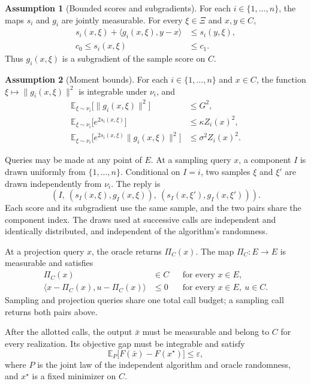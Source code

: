 \documentclass[10pt]{article}
\theoremstyle{definition}
\newtheorem{assumption}{Assumption}
\begin{document}
\begin{assumption}[Bounded scores and subgradients]
For each $i\in\{1,\ldots,n\}$, the maps $s_i$ and $g_i$ are jointly measurable. For every $\xi\in\Xi$ and $x,y\in C$,
\[
\begin{aligned}
s_i(x,\xi)+\langle g_i(x,\xi),y-x\rangle
&\leq s_i(y,\xi),\\
c_0\leq s_i(x,\xi)&\leq c_1.
\end{aligned}
\]
Thus $g_i(x,\xi)$ is a subgradient of the sample score on $C$.
\end{assumption}

\begin{assumption}[Moment bounds]
For each $i\in\{1,\ldots,n\}$ and $x\in C$, the function $\xi\mapsto\|g_i(x,\xi)\|^2$ is integrable under $\nu_i$, and
\[
\begin{aligned}
\mathbb{E}_{\xi\sim\nu_i}\bigl[\|g_i(x,\xi)\|^2\bigr]
&\leq G^2,\\
\mathbb{E}_{\xi\sim\nu_i}\bigl[e^{2s_i(x,\xi)}\bigr]
&\leq \kappa Z_i(x)^2,\\
\mathbb{E}_{\xi\sim\nu_i}\bigl[e^{2s_i(x,\xi)}\|g_i(x,\xi)\|^2\bigr]
&\leq \sigma^2 Z_i(x)^2.
\end{aligned}
\]
\end{assumption}

Queries may be made at any point of $E$. At a sampling query $x$, a component $I$ is drawn uniformly from $\{1,\ldots,n\}$. Conditional on $I=i$, two samples $\xi$ and $\xi'$ are drawn independently from $\nu_i$. The reply is
\[
\left(I,\ (s_I(x,\xi),g_I(x,\xi)),\
(s_I(x,\xi'),g_I(x,\xi'))\right).
\]
Each score and its subgradient use the same sample, and the two pairs share the component index. The draws used at successive calls are independent and identically distributed, and independent of the algorithm's randomness.

At a projection query $x$, the oracle returns $\Pi_C(x)$. The map $\Pi_C:E\to E$ is measurable and satisfies
\[
\begin{aligned}
\Pi_C(x)&\in C &&\text{for every }x\in E,\\
\langle x-\Pi_C(x),u-\Pi_C(x)\rangle&\leq0
&&\text{for every }x\in E,\ u\in C.
\end{aligned}
\]
Sampling and projection queries share one total call budget; a sampling call returns both pairs above.

After the allotted calls, the output $\bar{x}$ must be measurable and belong to $C$ for every realization. Its objective gap must be integrable and satisfy
\[
\mathbb{E}_{P}\bigl[F(\bar{x})-F(x^\star)\bigr]\leq\varepsilon,
\]
where $P$ is the joint law of the independent algorithm and oracle randomness, and $x^\star$ is a fixed minimizer on $C$.
\end{document}
